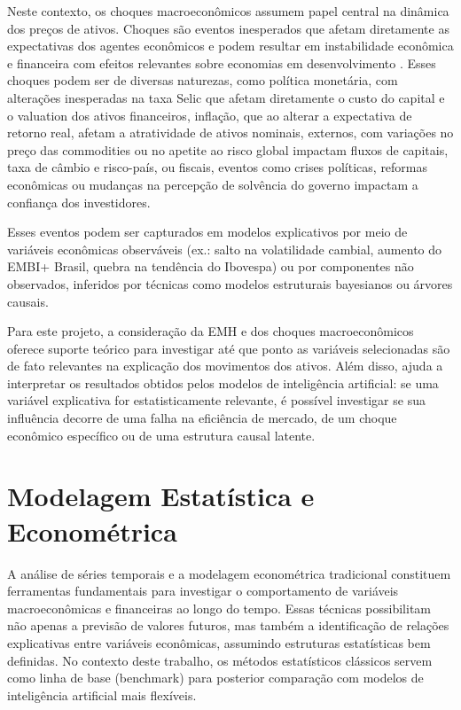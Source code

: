 \documentclass[	12pt, Times, openright, oneside, a4paper, english, brazil]{abntex2}
\begin{document}
Neste contexto, os choques macroeconômicos assumem papel central na dinâmica dos preços de ativos. Choques são eventos inesperados que afetam diretamente as expectativas dos agentes econômicos e podem resultar em instabilidade econômica e financeira com efeitos relevantes sobre economias em
desenvolvimento \cite{Dornelas2024}. Esses choques podem ser de diversas naturezas, como política monetária, com alterações inesperadas na taxa Selic que afetam diretamente o custo do capital e o valuation dos ativos financeiros, inflação, que ao alterar a expectativa de retorno real, afetam a atratividade de ativos nominais, externos, com variações no preço das commodities ou no apetite ao risco global impactam fluxos de capitais, taxa de câmbio e risco-país, ou fiscais, eventos como crises políticas, reformas econômicas ou mudanças na percepção de solvência do governo impactam a confiança dos investidores.

Esses eventos podem ser capturados em modelos explicativos por meio de variáveis econômicas observáveis (ex.: salto na volatilidade cambial, aumento do EMBI+ Brasil, quebra na tendência do Ibovespa) ou por componentes não observados, inferidos por técnicas como modelos estruturais bayesianos ou árvores causais.

Para este projeto, a consideração da EMH e dos choques macroeconômicos oferece suporte teórico para investigar até que ponto as variáveis selecionadas são de fato relevantes na explicação dos movimentos dos ativos. Além disso, ajuda a interpretar os resultados obtidos pelos modelos de inteligência artificial: se uma variável explicativa for estatisticamente relevante, é possível investigar se sua influência decorre de uma falha na eficiência de mercado, de um choque econômico específico ou de uma estrutura causal latente.

\chapter{Modelagem Estatística e Econométrica}

A análise de séries temporais e a modelagem econométrica tradicional constituem ferramentas fundamentais para investigar o comportamento de variáveis macroeconômicas e financeiras ao longo do tempo. Essas técnicas possibilitam não apenas a previsão de valores futuros, mas também a identificação de relações explicativas entre variáveis econômicas, assumindo estruturas estatísticas bem definidas. No contexto deste trabalho, os métodos estatísticos clássicos servem como linha de base (benchmark) para posterior comparação com modelos de inteligência artificial mais flexíveis.
\end{document}
